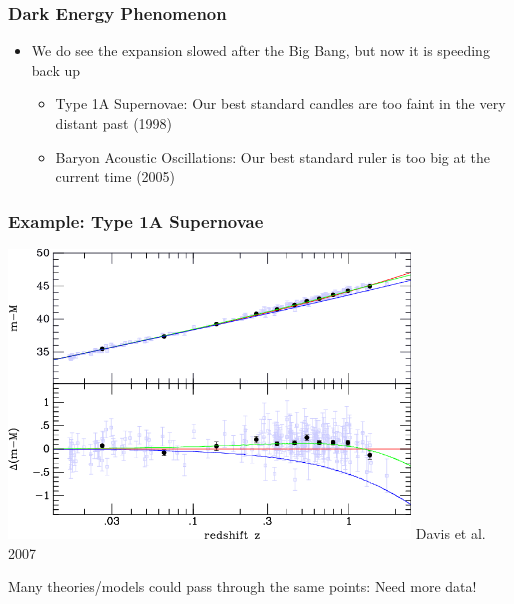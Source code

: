 \documentclass{beamer}
\begin{document}
\frame
{
    \frametitle{Dark Energy Phenomenon}

 
    \begin{itemize}

        \item We do see the expansion slowed after the Big Bang, but now it is
            speeding back up

        \begin{itemize}
            \item Type 1A Supernovae: Our best standard candles are too faint in the very distant past (1998)
            \item Baryon Acoustic Oscillations: Our best standard ruler is too big at the current time (2005)
        \end{itemize}

    \end{itemize}

}


\frame
{
    \frametitle{Example: Type 1A Supernovae}

 
    \begin{center}
        \includegraphics[width=0.8\textwidth]{davis_hub.png}
        \newline
        {\tiny Davis et al. 2007}
    \end{center}
    
    \begin{center}
        Many theories/models could pass through the same points: 
        \newline
        {\color{gold} Need more data!}
    \end{center}
}
\end{document}
